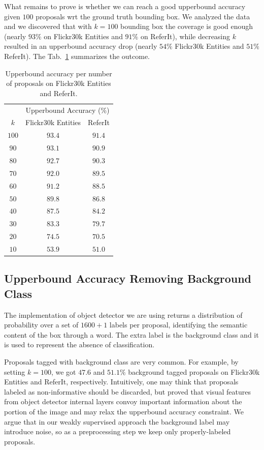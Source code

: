 What remains to prove is whether we can reach a good upperbound
accuracy given $100$ proposals wrt the ground truth bounding box. We
analyzed the data and we discovered that with $k = 100$ bounding box
the coverage is good enough (nearly $93\%$ on Flickr30k Entities and
$91\%$ on ReferIt), while decreasing $k$ resulted in an upperbound
accuracy drop (nearly $54\%$ Flickr30k Entities and $51\%$ ReferIt).
The Tab.~\ref{tab:bb-coverage} summarizes the outcome.

\begin{table}
  \centering
  \begin{tabular}{c|cc}
     & \multicolumn{2}{c}{Upperbound Accuracy (\%)} \\
    $k$ & Flickr30k Entities & ReferIt \\\hline 
    $100$ & $93.4$ & $91.4$ \\ 
     $90$ & $93.1$ & $90.9$ \\  
     $80$ & $92.7$ & $90.3$ \\
     $70$ & $92.0$ & $89.5$ \\
     $60$ & $91.2$ & $88.5$ \\
     $50$ & $89.8$ & $86.8$ \\
     $40$ & $87.5$ & $84.2$ \\
     $30$ & $83.3$ & $79.7$ \\
     $20$ & $74.5$ & $70.5$ \\
     $10$ & $53.9$ & $51.0$ \\\hline
  \end{tabular}
  \caption[Upperbound accuracy per number of proposals on Flickr30k
    Entities and ReferIt]{ Upperbound accuracy per number of proposals
    on Flickr30k Entities and ReferIt.}
  \label{tab:bb-coverage}
\end{table}

\subsection{Upperbound Accuracy Removing Background Class}

The implementation of object detector we are using
\cite{anderson2018bottom} returns a distribution of probability over a
set of $1600 + 1$ labels per proposal, identifying the semantic
content of the box through a word. The extra label is the background
class and it is used to represent the absence of classification.

Proposals tagged with background class are very common. For example,
by setting $k = 100$, we got $47.6$ and $51.1\%$ background tagged
proposals on Flickr30k Entities and ReferIt, respectively.
Intuitively, one may think that proposals labeled as non-informative
should be discarded, but \cite{yu2018rethinking} proved that visual
features from object detector internal layers convoy important
information about the portion of the image and may relax the
upperbound accuracy constraint. We argue that in our weakly supervised
approach the background label may introduce noise, so as a
preprocessing step we keep only properly-labeled proposals.

